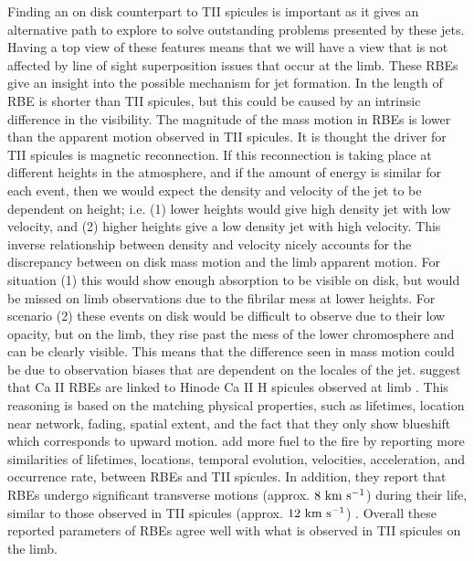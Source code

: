 Finding an on disk counterpart to TII spicules is important as it gives an alternative path to explore to solve outstanding problems presented by these jets. Having a top view of these features means that we will have a view that is not affected by line of sight superposition issues that occur at the limb. These RBEs give an insight into the possible mechanism for jet formation. In \cite{Langangen2008ApJ} the length of RBE is shorter than TII spicules, but this could be caused by an intrinsic difference in the visibility. The magnitude of the mass motion in RBEs is lower than the apparent motion observed in TII spicules. It is thought the driver for TII spicules is magnetic reconnection. If this reconnection is taking place at different heights in the atmosphere, and if the amount of energy is similar for each event, then we would expect the density and velocity of the jet to be dependent on height; i.e. (1) lower heights would give high density jet with low velocity, and (2) higher heights give a low density jet with high velocity. This inverse relationship between density and velocity nicely accounts for the discrepancy between on disk mass motion and the limb apparent motion. For situation (1) this would show enough absorption to be visible on disk, but would be missed on limb observations due to the fibrilar mess at lower heights. For scenario (2) these events on disk would be difficult to observe due to their low opacity, but on the limb, they rise past the mess of the lower chromosphere and can be clearly visible. This means that the difference seen in mass motion could be due to observation biases that are dependent on the locales of the jet. \cite{Langangen2008ApJ} suggest that Ca II RBEs are linked to Hinode Ca II H spicules observed at limb \cite{Pontieu2007PASJ}. This reasoning is based on the matching physical properties, such as lifetimes, location near network, fading, spatial extent, and the fact that they only show blueshift which corresponds to upward motion. \cite{Rouppe2009ApJ} add more fuel to the fire by reporting more similarities of lifetimes, locations, temporal evolution, velocities, acceleration, and occurrence rate, between RBEs and TII spicules. In addition, they report that RBEs undergo significant transverse motions (approx. $8~\rm{km ~s^{-1}}$) during their life, similar to those observed in TII spicules (approx. $12~\rm{km ~s^{-1}}$) \citep{De_Pontieu2007}. Overall these reported parameters of RBEs agree well with what is observed in TII spicules on the limb.
